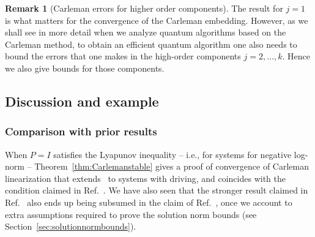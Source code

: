 \documentclass[superscriptaddress,onecolumn,nofootinbib,longbibliography,a4paper,accepted=2026-09-29]{quantumarticle}
\theoremstyle{plain}
\theoremstyle{definition}
\newtheorem{rmk}[thm]{Remark}
\numberwithin{thm}{section}
\numberwithin{assumption}{section}
\numberwithin{lemma}{section}
\numberwithin{prop}{section}
\numberwithin{cor}{section}
\numberwithin{definition}{section}
\numberwithin{rmk}{section}
\numberwithin{equation}{section}
\begin{document}
\begin{rmk}[Carleman errors for higher order components]
    The result for $j=1$ is what matters for the convergence of the Carleman embedding. However, as we shall see in more detail when we analyze quantum algorithms based on the Carleman method, to obtain an efficient quantum algorithm one also needs to bound the errors that one makes in the high-order components $j=2,\dots, k$. Hence we also give bounds for those components.
\end{rmk}


\subsection{Discussion and example}
\label{sec:comparisons}


\subsubsection*{Comparison with prior results}

When $P = I$ satisfies the Lyapunov inequality -- i.e., for systems for negative log-norm -- Theorem~\ref{thm:Carlemanstable} gives a proof of convergence of Carleman linearization that extends~\cite{forets2017explicit, costa2023further} to systems with driving, and coincides with the condition claimed in Ref.~\cite{krovi2023improved}. We have also seen that the stronger result claimed in Ref.~\cite{liu2021efficient} also ends up being subsumed in the claim of Ref.~\cite{krovi2023improved}, once we account to extra assumptions required to prove the solution norm bounds (see Section~\ref{sec:solutionnormbounds}).
\end{document}
